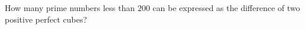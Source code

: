 How many prime numbers less than $200$ can be expressed as the difference of two positive perfect cubes?
